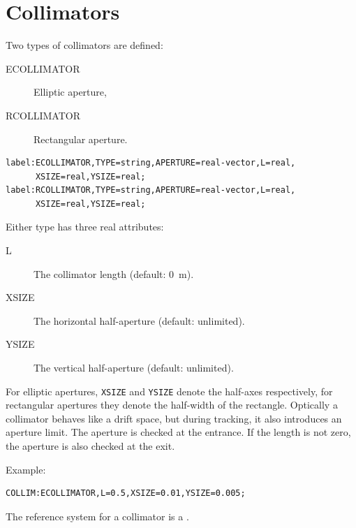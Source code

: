 
\section{Collimators}
\label{sec:collimators}
Two types of collimators are defined:
\begin{description}
\item[ECOLLIMATOR]
  \label{sec:ecollimator}
  Elliptic aperture,
\item[RCOLLIMATOR]
  \label{sec:rcollimator}
  Rectangular aperture.
\end{description}
\begin{verbatim}
label:ECOLLIMATOR,TYPE=string,APERTURE=real-vector,L=real,
      XSIZE=real,YSIZE=real;
label:RCOLLIMATOR,TYPE=string,APERTURE=real-vector,L=real,
      XSIZE=real,YSIZE=real;
\end{verbatim}
Either type has three real attributes:
\begin{description}
\item[L]
  The collimator length (default: 0~m).
\item[XSIZE]
  The horizontal half-aperture (default: unlimited).
\item[YSIZE]
  The vertical half-aperture (default: unlimited).
\end{description}
For elliptic apertures,
\texttt{XSIZE} and \texttt{YSIZE} denote the half-axes respectively,
for rectangular apertures they denote the half-width of the rectangle.
Optically a collimator behaves like a drift space, but during tracking,
it also introduces an aperture limit.
The aperture is checked at the entrance.
If the length is not zero, the aperture is also checked at the exit.

\noindent Example:
\begin{verbatim}
COLLIM:ECOLLIMATOR,L=0.5,XSIZE=0.01,YSIZE=0.005;
\end{verbatim}
The reference system for a collimator is a 
.


